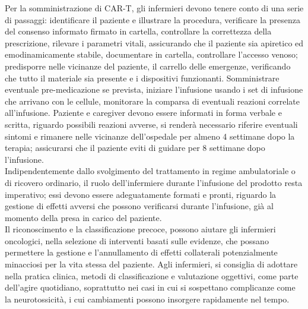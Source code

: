 Per la somministrazione di CAR-T, gli infermieri devono tenere conto di una serie di passaggi: identificare il paziente e 
illustrare la procedura, verificare la presenza del consenso informato firmato in cartella, controllare la correttezza 
della prescrizione, rilevare i parametri vitali, assicurando che il paziente sia apiretico ed emodinamicamente stabile, 
documentare in cartella, controllare l’accesso venoso; predisporre nelle vicinanze del paziente, il carrello delle 
emergenze, verificando che tutto il materiale sia presente e i dispositivi funzionanti\cite{NURSINGCART}. 
Somministrare eventuale pre-medicazione se prevista, iniziare l’infusione usando i set di infusione che arrivano con 
le cellule, monitorare la comparsa di eventuali reazioni correlate all’infusione. 
Paziente e caregiver devono essere informati in forma verbale e scritta, riguardo possibili reazioni avverse, 
si renderà necessario riferire eventuali sintomi e rimanere nelle vicinanze dell’ospedale per almeno 4 settimane dopo 
la terapia; assicurarsi che il paziente eviti di guidare per 8 settimane dopo l’infusione\cite{NURSINGCART}.\\

Indipendentemente dallo svolgimento del trattamento in regime ambulatoriale o di ricovero ordinario, 
il ruolo dell’infermiere durante l’infusione del prodotto resta imperativo; essi devono essere adeguatamente 
formati e pronti, riguardo la gestione di  effetti avversi che possono verificarsi durante l’infusione, 
già al momento della presa in carico del paziente\cite{article2}.\\
Il riconoscimento e la classificazione precoce, possono aiutare gli infermieri oncologici, nella selezione di interventi 
basati sulle evidenze, che possano permettere la gestione e l’annullamento di effetti collaterali potenzialmente 
minacciosi per la vita stessa del paziente. Agli infermieri, si consiglia di adottare nella pratica clinica, 
metodi di classificazione e valutazione oggettivi, come parte dell’agire quotidiano, soprattutto nei 
casi in cui si sospettano complicanze come la neurotossicità, i cui cambiamenti possono insorgere 
rapidamente nel tempo\cite{article4}.\\

